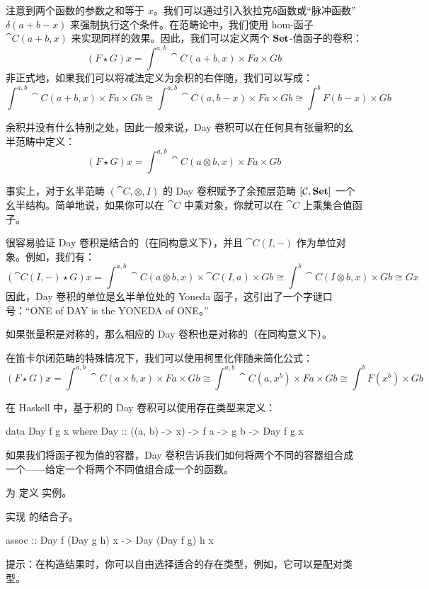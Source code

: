 \documentclass[DaoFP]{subfiles}
\begin{document}
注意到两个函数的参数之和等于 $x$。我们可以通过引入狄拉克δ函数或“脉冲函数”$\delta(a + b - x)$ 来强制执行这个条件。在范畴论中，我们使用 hom-函子 $\cat C (a + b, x)$ 来实现同样的效果。因此，我们可以定义两个 $\mathbf{Set}$-值函子的卷积：
\[ (F \star G) x = \int^{a, b} \cat C (a + b, x) \times F a \times G b \]
非正式地，如果我们可以将减法定义为余积的右伴随，我们可以写成：
\[ \int^{a, b} \cat C (a + b, x) \times F a \times G b \cong \int^{a, b} \cat C (a, b - x) \times F a \times G b \cong \int^b F (b - x) \times G b\]

余积并没有什么特别之处，因此一般来说，Day 卷积可以在任何具有张量积的幺半范畴中定义：
\[ (F \star G) x = \int^{a, b} \cat C (a \otimes b, x) \times F a \times G b \]

事实上，对于幺半范畴 $(\cat C, \otimes, I)$ 的 Day 卷积赋予了余预层范畴 $[\mathcal{C}, \mathbf{Set}]$ 一个幺半结构。简单地说，如果你可以在 $\cat C$ 中乘对象，你就可以在 $\cat C$ 上乘集合值函子。

很容易验证 Day 卷积是结合的（在同构意义下），并且 $\cat C(I, -)$ 作为单位对象。例如，我们有：
\[ (\cat C(I, -) \star G) x =  \int^{a, b} \cat C (a \otimes b, x) \times \cat C(I, a) \times G b \cong 
  \int^{b} \cat C (I \otimes b, x) \times  G b \cong G x\]
因此，Day 卷积的单位是幺半单位处的 Yoneda 函子，这引出了一个字谜口号：“ONE of DAY is the YONEDA of ONE。”

如果张量积是对称的，那么相应的 Day 卷积也是对称的（在同构意义下）。

在笛卡尔闭范畴的特殊情况下，我们可以使用柯里化伴随来简化公式：
\[ (F \star G) x = \int^{a, b} \cat C (a \times b, x) \times F a \times G b \cong  \int^{a, b} \cat C (a, x^b) \times F a \times G b \cong  \int^{b}  F (x^b) \times G b\]

在 Haskell 中，基于积的 Day 卷积可以使用存在类型来定义：
\begin{haskell}
data Day f g x where
  Day :: ((a, b) -> x) -> f a -> g b -> Day f g x
\end{haskell}

如果我们将函子视为值的容器，Day 卷积告诉我们如何将两个不同的容器组合成一个——给定一个将两个不同值组合成一个的函数。

\begin{exercise}
为  定义  实例。
\end{exercise}

\begin{exercise}
实现  的结合子。
\begin{haskell}
assoc :: Day f (Day g h) x -> Day (Day f g) h x
\end{haskell}
提示：在构造结果时，你可以自由选择适合的存在类型，例如，它可以是配对类型。
\end{exercise}
\end{document}
